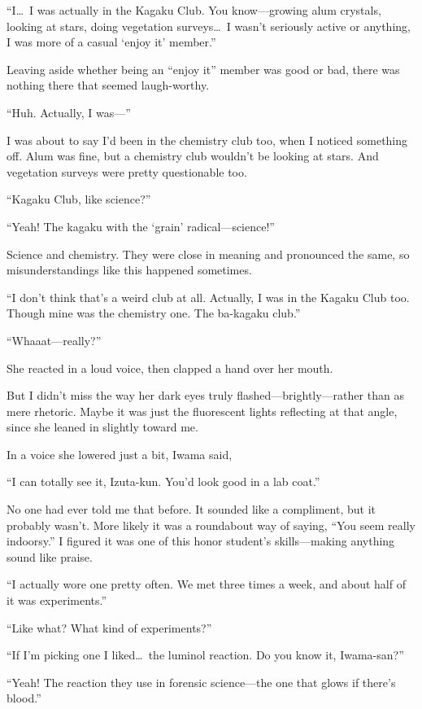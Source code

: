 \documentclass[
    a4paper,
    12pt,
    twoside,
    openany,
    UTF8,
    fontset=windows
]{ctexbook}
\begin{document}
``I\dots\ I was actually in the Kagaku Club. You know---growing alum crystals, looking at stars, doing vegetation surveys\dots\ I wasn't seriously active or anything, I was more of a casual `enjoy it' member.''

Leaving aside whether being an ``enjoy it'' member was good or bad, there was nothing there that seemed laugh-worthy.

``Huh. Actually, I was---''

I was about to say I'd been in the chemistry club too, when I noticed something off. Alum was fine, but a chemistry club wouldn't be looking at stars. And vegetation surveys were pretty questionable too.

``Kagaku Club, like science?''

``Yeah! The kagaku with the `grain' radical---science!''

Science and chemistry. They were close in meaning and pronounced the same, so misunderstandings like this happened sometimes.

``I don't think that's a weird club at all. Actually, I was in the Kagaku Club too. Though mine was the chemistry one. The ba-kagaku club.''

``Whaaat---really?''

She reacted in a loud voice, then clapped a hand over her mouth.

But I didn't miss the way her dark eyes truly flashed---brightly---rather than as mere rhetoric. Maybe it was just the fluorescent lights reflecting at that angle, since she leaned in slightly toward me.

In a voice she lowered just a bit, Iwama said,

``I can totally see it, Izuta-kun. You'd look good in a lab coat.''

No one had ever told me that before. It sounded like a compliment, but it probably wasn't. More likely it was a roundabout way of saying, ``You seem really indoorsy.'' I figured it was one of this honor student's skills---making anything sound like praise.

``I actually wore one pretty often. We met three times a week, and about half of it was experiments.''

``Like what? What kind of experiments?''

``If I'm picking one I liked\dots\ the luminol reaction. Do you know it, Iwama-san?''

``Yeah! The reaction they use in forensic science---the one that glows if there's blood.''
\end{document}
